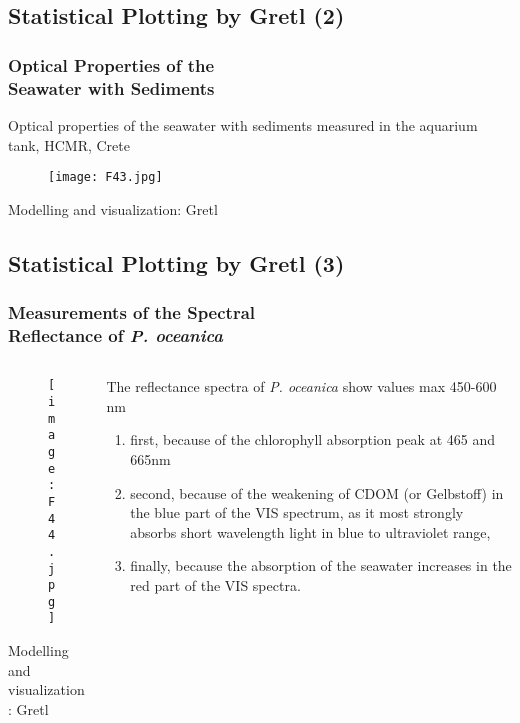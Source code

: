 \documentclass[pdflatex,compress,9pt,
	xcolor={dvipsnames,dvipsnames,svgnames,x11names,table},
	hyperref={colorlinks = true,breaklinks = true, urlcolor = NavyBlue, breaklinks = true}]{beamer}
\begin{document}
\subsection{Statistical Plotting by Gretl (2)}
\begin{frame}\frametitle{Optical Properties of the \\Seawater \alert{with} Sediments}
\small{Optical properties of the seawater with sediments measured in the aquarium tank, \ac{HCMR}, Crete}
\begin{figure}[H]
	\centering
		\texttt{[image: F43.jpg]}
\end{figure}
\scriptsize{Modelling and visualization: \ac{Gretl}}
\end{frame}

\subsection{Statistical Plotting by Gretl (3)}
\begin{frame}\frametitle{Measurements of the Spectral \\Reflectance of \emph{P. oceanica}}
\begin{minipage}[0.4\textheight]{\textwidth}
\begin{columns}[T]
\begin{column}{0.6\textwidth}
\vspace{1em}
\begin{figure}[H]
	\centering
		\texttt{[image: F44.jpg]}
\end{figure}
\scriptsize{Modelling and visualization: \ac{Gretl}}
\end{column}
\begin{column}{0.4\textwidth}
\small{The reflectance spectra of \emph{P. oceanica} show values max 450-600 nm
\begin{enumerate}
	\item first, because of the chlorophyll absorption peak at 465 and 665nm
	\item second, because of the weakening of \ac{CDOM} (or Gelbstoff) in the blue part of the \ac{VIS} spectrum, as it most strongly absorbs short wavelength light in blue to ultraviolet range,
	\item finally, because the absorption of the seawater increases in the red part of the \ac{VIS} spectra.
\end{enumerate}}
\end{column}
\end{columns}
\end{minipage}
\end{frame}
\end{document}

